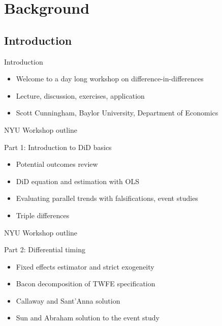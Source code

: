 \documentclass{beamer}
\begin{document}



\section{Background}

\subsection{Introduction}

\begin{frame}{Introduction}

\begin{itemize}
\item Welcome to a day long workshop on difference-in-differences 
\item Lecture, discussion, exercises, application
\item Scott Cunningham, Baylor University, Department of Economics
\end{itemize}

\end{frame}


\begin{frame}{NYU Workshop outline}

Part 1: Introduction to DiD basics 
	\begin{itemize}
	\item Potential outcomes review
	\item DiD equation and estimation with OLS
	\item Evaluating parallel trends with falsifications, event studies 
	\item Triple differences
	\end{itemize}

\end{frame}

\begin{frame}{NYU Workshop outline}

Part 2: Differential timing
	\begin{itemize}
	\item Fixed effects estimator and strict exogeneity
	\item Bacon decomposition of TWFE specification 
	\item Callaway and Sant'Anna solution
	\item Sun and Abraham solution to the event study
	\end{itemize}

\end{frame}
\end{document}
